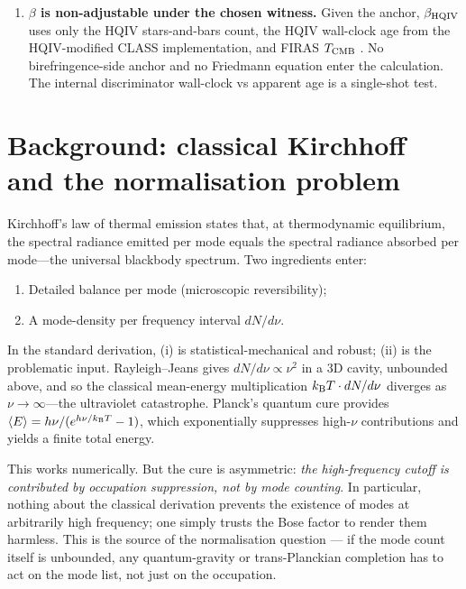\documentclass[11pt]{amsart}
\begin{document}
\begin{enumerate}[leftmargin=2em]
  lock-in scale-witness, observables such as CODATA $1/\alpha$,
  cosmic birefringence $\beta$, and CMB horizon scales are
  \emph{predictions or comparison layers}, not simultaneous
  anchors.  This paper exhibits $\beta$ as one such prediction.
\item \textbf{$\beta$ is non-adjustable under the chosen
  witness.}  Given the anchor, $\beta_{\rm HQIV}$ uses only the
  HQIV stars-and-bars count, the HQIV wall-clock age from the
  HQIV-modified CLASS implementation, and FIRAS $T_{\rm CMB}$
  \cite{fixsen2009}.  No birefringence-side anchor and no
  Friedmann equation enter the calculation.  The internal
  discriminator wall-clock vs apparent age is a single-shot test.
\end{enumerate}

\section{Background: classical Kirchhoff and the normalisation
problem}\label{sec:background}

Kirchhoff's law of thermal emission \cite{kirchhoff1860} states
that, at thermodynamic equilibrium, the spectral radiance emitted
per mode equals the spectral radiance absorbed per mode---the
universal blackbody spectrum.  Two ingredients enter:
\begin{enumerate}[leftmargin=2em]
\item Detailed balance per mode (microscopic reversibility);
\item A mode-density per frequency interval $dN/d\nu$.
\end{enumerate}
In the standard derivation, (i) is statistical-mechanical and
robust; (ii) is the problematic input.  Rayleigh--Jeans gives
$dN/d\nu\propto\nu^{2}$ in a 3D cavity, unbounded above, and so
the classical mean-energy multiplication $k_{\rm B}T\cdot dN/d\nu$
diverges as $\nu\to\infty$---the ultraviolet catastrophe.
Planck's quantum cure \cite{planck1901} provides
$\langle E\rangle=h\nu/(e^{h\nu/k_{\rm B}T}-1)$, which
exponentially suppresses high-$\nu$ contributions and yields a
finite total energy.

This works numerically.  But the cure is asymmetric:
\emph{the high-frequency cutoff is contributed by occupation
suppression, not by mode counting}.  In particular,
nothing about the classical derivation prevents the existence of
modes at arbitrarily high frequency; one simply trusts the Bose
factor to render them harmless.  This is the source of the
normalisation question --- if the mode count itself is unbounded,
any quantum-gravity or trans-Planckian completion has to act on
the mode list, not just on the occupation.
\end{document}
